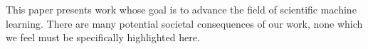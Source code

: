 This paper presents work whose goal is to advance the field of scientific machine learning. There are many potential societal consequences of our work, none which we feel must be specifically highlighted here.